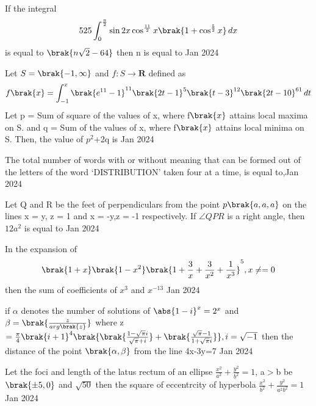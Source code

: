 \iffalse
  \title{Assignment}
  \author{EE24BTECH11038}
  \section{integer}
\fi 
\item If the integral 
\begin{align*}
    525\int_{0}^{\frac{\pi}{2}}\sin{2x}\cos^{\frac{11}{2}}{x}\brak{1+\cos^{\frac{5}{2}}{x}}\,dx
\end{align*}
is equal to $\brak{n\sqrt{2}-64}$ then n is equal to \hfill{Jan 2024}
\bigskip
\item Let $S=\brak{-1,\infty}$ and $f:S\rightarrow \mathbf{R}$ defined as 
\begin{align*}
    f\brak{x}=\int_{-1}^{x}\brak{e^{11}-1}^{11}\brak{2t-1}^5\brak{t-3}^{12}\brak{2t-10}^{61}\,dt
\end{align*}
Let p = Sum of square of the values of x, where f$\brak{x}$ attains local maxima on S. and q = Sum of the values of x, where f$\brak{x}$ attains local minima on S. Then, the value of $p^{2}$+2q is \hfill{Jan 2024}
\bigskip
\item The total number of words with or without meaning that can be formed out of the letters of the word `DISTRIBUTION' taken four at a time, 
is equal to,\hfill{Jan 2024}
\bigskip
\item Let Q and R be the feet of perpendiculars from the point $p\brak{a,a,a}$ on the lines x = y, z = 1 and x = -y,z = -1 respectively. If $\angle{QPR}$ is a right angle, then $12a^2$ is equal to \hfill{Jan 2024}
\bigskip
\item In the expansion of 
\begin{align*}
    \brak{1+x}\brak{1-x^2}\brak{1+\frac{3}{x}+\frac{3}{x^2}+\frac{1}{x^3}}^5, x\neq=0
\end{align*}
then the sum of coefficients of $x^3$ and $x^{-13}$ \hfill{Jan 2024}
\bigskip
\item if $\alpha$ denotes the number of solutions of $\abs{1-i}^{x}=2^x$ and $\beta=\brak{\frac{z}{arg\brak{z}}}$ where z$=\frac{\pi}{4}\brak{i+1}^4\brak{\brak{\frac{1-\sqrt{\pi}i}{\sqrt{\pi}+i}}+\brak{\frac{\sqrt{\pi}-1}{1+\sqrt{\pi}i}}},i=\sqrt{-1}$ then the  distance of the point $\brak{\alpha,\beta}$ from the line 4x-3y=7 \hfill{Jan 2024}
\bigskip
\item Let the foci and length of the latus rectum of an ellipse $\frac{x^2}{a^2}+\frac{y^2}{b^2}=1$, a$>$b be $\brak{\pm5,0}$ and $\sqrt{50}$ then the square of eccentrcity of hyperbola $\frac{x^2}{b^2}+\frac{y^2}{a^2b^2}=1$ \hfill{Jan 2024}
